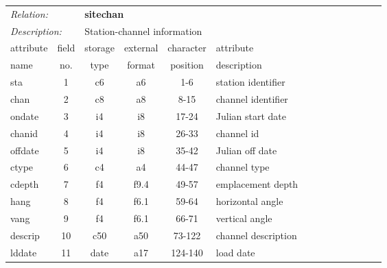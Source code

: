 \begin{center}
\begin{tabular*}{1.0\textwidth}{@{\extracolsep{\fill}}|lccccl|}  \hline
\multicolumn{2}{|l}{{\it Relation:}} & \multicolumn{4}{l|}{{\bf sitechan}} \\
\multicolumn{2}{|l}{{\it Description:}} & \multicolumn{4}{l|}{Station-channel information} \\ \cline{1-6}
\multicolumn{1}{|l}{attribute \vspace{-0.07 in}} & \multicolumn{1}{c}{field} & \multicolumn{1}{c}{storage} & \multicolumn{1}{c}{external} & \multicolumn{1}{c}{character} & \multicolumn{1}{l|}{attribute} \\
\multicolumn{1}{|l}{name} &  \multicolumn{1}{c}{no.} & \multicolumn{1}{c}{type} & \multicolumn{1}{c}{format} & \multicolumn{1}{c}{position} & \multicolumn{1}{l|}{description} \\
 \hline\hline
sta     & 1  &   c6   &  a6    &    1-6   & station identifier \\
chan    & 2  &   c8   &  a8    &    8-15  & channel identifier \\
ondate  & 3  &   i4   &  i8    &   17-24  & Julian start date \\
chanid  & 4  &   i4   &  i8    &   26-33  & channel id \\
offdate & 5  &   i4   &  i8    &   35-42  & Julian off date \\
ctype   & 6  &   c4   &  a4    &   44-47  & channel type \\
cdepth  & 7  &   f4   &  f9.4  &   49-57  & emplacement depth \\
hang    & 8  &   f4   &  f6.1  &   59-64  & horizontal angle \\
vang    & 9  &   f4   &  f6.1  &   66-71  & vertical angle 
$\;\;\;\;\;\;\;\;\;\;\;\;\;\;\;\;\;\;\;
\;\;\;\;\;\;\;\;\;\;\;\;\;\;\;\;\;\;\;$\\
descrip &10  &   c50  &  a50   &   73-122 & channel description \\
lddate  &11  &  date  &  a17   &  124-140 & load date \\ \cline{1-6}
\end{tabular*}
\end{center}

\newpage


